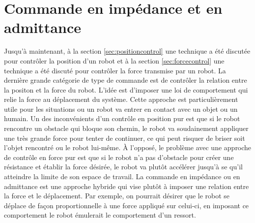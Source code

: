 \section{Commande en impédance et en admittance}
\label{sec:impcontrol}

Jusqu'à maintenant, à la section \ref{sec:positioncontrol} une technique a été discutée pour contrôler la position d'un robot et à la section \ref{sec:forcecontrol} une technique a été discuté pour contrôler la force transmise par un robot. La dernière grande catégorie de type de commande est de contrôler la relation entre la positon et la force du robot. L'idée est d'imposer une loi de comportement qui relie la force au déplacement du système. Cette approche est particulièrement utile pour les situations ou un robot va entrer en contact avec un objet ou un humain. Un des inconvénients d'un contrôle en position pur est que si le robot rencontre un obstacle qui bloque son chemin, le robot va soudainement appliquer une très grande force pour tenter de continuer, ce qui peut risquer de briser soit l'objet rencontré ou le robot lui-même. À l'opposé, le problème avec une approche de contrôle en force pur est que si le robot n'a pas d'obstacle pour créer une résistance et établir la force désirée, le robot va plutôt accélérer jusqu'à se qu'il atteindre la limite de son espace de travail. La commande en impédance ou en admittance est une approche hybride qui vise plutôt à imposer une relation entre la force et le déplacement. Par exemple, on pourrait désirer que le robot se déplace de façon proportionnelle à une force appliqué sur celui-ci, en imposant ce comportement le robot émulerait le comportement d'un ressort. 

